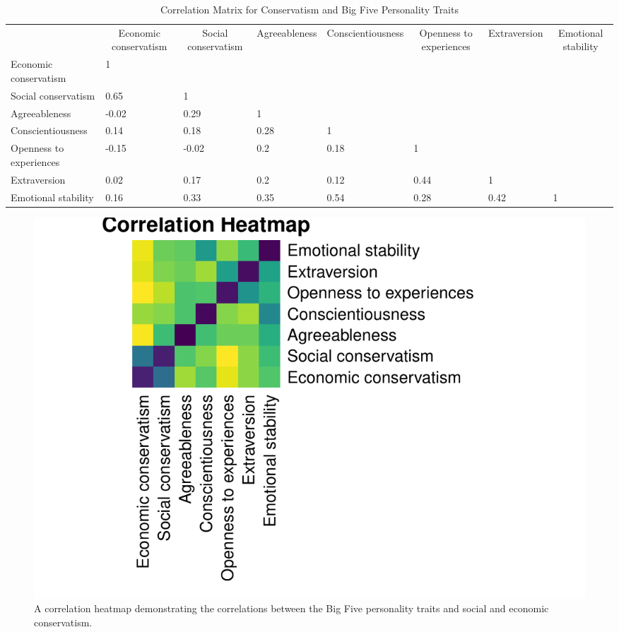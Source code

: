 \documentclass[man]{apa6}
\makeatletter
\newenvironment{lltable}{\begin{landscape}\begin{center}\begin{ThreePartTable}}{\end{ThreePartTable}\end{center}\end{landscape}}
\newcommand\LastLTentrywidth{1em}
\newlength\longtablewidth
\newcommand{\getlongtablewidth}{\begingroup \ifcsname LT@\roman{LT@tables}\endcsname \global\longtablewidth=0pt \renewcommand{\LT@entry}[2]{\global\advance\longtablewidth by ##2\relax\gdef\LastLTentrywidth{##2}}\@nameuse{LT@\roman{LT@tables}} \fi \endgroup}
\makeatother
\begin{document}
\begin{lltable}


\tiny{
\begin{longtable}{llllllll}\noalign{\getlongtablewidth\global\LTcapwidth=\longtablewidth}
\caption{\label{tab:correlations}Correlation Matrix for Conservatism and Big Five Personality Traits}\\
\toprule
 & \multicolumn{1}{c}{Economic conservatism} & \multicolumn{1}{c}{Social conservatism} & \multicolumn{1}{c}{Agreeableness} & \multicolumn{1}{c}{Conscientiousness} & \multicolumn{1}{c}{Openness to experiences} & \multicolumn{1}{c}{Extraversion} & \multicolumn{1}{c}{Emotional stability}\\
\midrule
Economic conservatism & 1 &  &  &  &  &  & \\
Social conservatism & 0.65 & 1 &  &  &  &  & \\
Agreeableness & -0.02 & 0.29 & 1 &  &  &  & \\
Conscientiousness & 0.14 & 0.18 & 0.28 & 1 &  &  & \\
Openness to experiences & -0.15 & -0.02 & 0.2 & 0.18 & 1 &  & \\
Extraversion & 0.02 & 0.17 & 0.2 & 0.12 & 0.44 & 1 & \\
Emotional stability & 0.16 & 0.33 & 0.35 & 0.54 & 0.28 & 0.42 & 1\\
\bottomrule
\end{longtable}
}
\end{lltable}

\begin{figure}
\centering
\includegraphics{manuscript_files/figure-latex/figure1-1.pdf}
\caption{\label{fig:figure1}A correlation heatmap demonstrating the
correlations between the Big Five personality traits and social and
economic conservatism.}
\end{figure}
\end{document}
